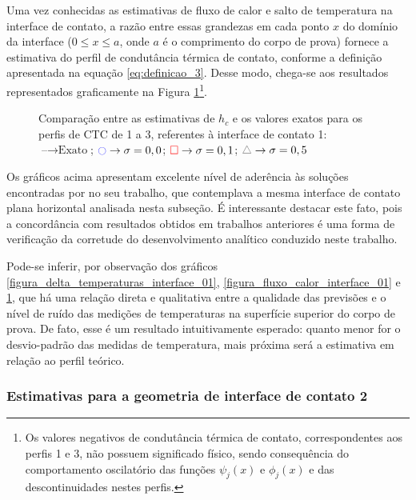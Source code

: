 Uma vez conhecidas as estimativas de fluxo de calor e salto de temperatura na interface de contato, a razão entre essas grandezas em cada ponto $x$ do domínio da interface ($0 \le x \le a$, onde $a$ é o comprimento do corpo de prova) fornece a estimativa do perfil de condutância térmica de contato, conforme a definição apresentada na equação \eqref{eq:definicao_3}. Desse modo, chega-se aos resultados representados graficamente na Figura \ref{figura_ctc_interface_01}\footnote{Os valores negativos de condutância térmica de contato, correspondentes aos perfis 1 e 3, não possuem significado físico, sendo consequência do comportamento oscilatório das funções $\psi_j(x)$ e $\phi_j(x)$ e das descontinuidades nestes perfis.}.
\begin{figure}[h!b]
	\caption{Comparação entre as estimativas de $h_c$ e os valores exatos para os perfis de CTC de 1 a 3, referentes à interface de contato 1: $\text{--} \rightarrow \text{Exato}$; $\textcolor{blue}{\ocircle} \rightarrow \sigma = 0,0$; $\textcolor{red}{\square} \rightarrow \sigma = 0,1$; $\textcolor{gray}{\triangle} \rightarrow \sigma = 0,5$}
	\label{figura_ctc_interface_01}
\end{figure}

Os gráficos acima apresentam excelente nível de aderência às soluções encontradas por \cite{tese_padilha} no seu trabalho, que contemplava a mesma interface de contato plana horizontal analisada nesta subseção. É interessante destacar este fato, pois a concordância com resultados obtidos em trabalhos anteriores é uma forma de verificação da corretude do desenvolvimento analítico conduzido neste trabalho.

Pode-se inferir, por observação dos gráficos \ref{figura_delta_temperaturas_interface_01}, \ref{figura_fluxo_calor_interface_01} e \ref{figura_ctc_interface_01}, que há uma relação direta e qualitativa entre a qualidade das previsões e o nível de ruído das medições de temperaturas na superfície superior do corpo de prova. De fato, esse é um resultado intuitivamente esperado: quanto menor for o desvio-padrão das medidas de temperatura, mais próxima será a estimativa em relação ao perfil teórico.

\subsubsection{Estimativas para a geometria de interface de contato 2}

